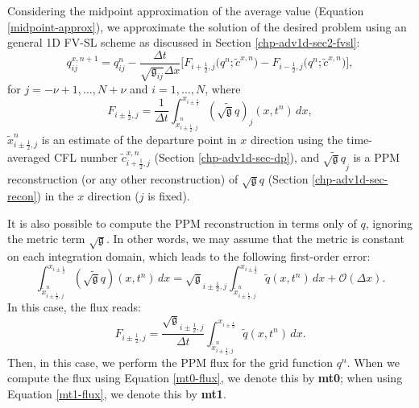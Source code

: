 Considering the midpoint approximation of the average value (Equation \eqref{midpoint-approx}), we approximate
the solution of the desired problem using an general 1D FV-SL scheme as discussed in Section \ref{chp-adv1d-sec2-fvsl}:
\begin{equation}
	\label{1d-qx}
	q^{x,n+1}_{ij} = q^{n}_{ij}  - \frac{\Delta t}{\sqrt{\mathfrak{g}_{ij}}\Delta x}
	\bigg[{F}_{i+\frac{1}{2},j}
	\big({q}^{n}; \tilde{c}^{x,n}\big) - 
	{F}_{i-\frac{1}{2},j}
	\big({q}^{n}; \tilde{c}^{x,n}\big)\bigg],
\end{equation}
for  $j=-\nu+1, \ldots, N+\nu$ and $i=1, \ldots, N$, where
\begin{equation}
	\label{mt0-flux}
	{F}_{i\pm\frac{1}{2},j} = \frac{1}{\Delta t}\int_{ \tilde{x}_{i\pm\frac{1}{2},j}^n}^{x_{i\pm\frac{1}{2}}}(\widetilde{\sqrt{\mathfrak{g}}{q}})_j(x, t^n) \,dx,
\end{equation}
$\tilde{x}_{i\pm\frac{1}{2},j}^n$ is an estimate of the departure point in $x$ direction using the time-averaged
CFL number $\tilde{c}^{x,n}_{i+\frac{1}{2},j}$ (Section \ref{chp-adv1d-sec-dp}),
and $\widetilde{\sqrt{\mathfrak{g}}{q}}_j$ is a PPM reconstruction (or any other reconstruction) of $\sqrt{\mathfrak{g}}{q}$ (Section \ref{chp-adv1d-sec-recon})
in the $x$ direction ($j$ is fixed).

It is also possible to compute the PPM reconstruction in terms only of $q$, ignoring the metric term $\sqrt{\mathfrak{g}}$.
In other words, we may assume that the metric is constant on each integration domain, which leads to the following first-order error:
\begin{equation}
\int_{ \tilde{x}_{i\pm\frac{1}{2},j}^n}^{x_{i\pm\frac{1}{2}}}(\widetilde{\sqrt{\mathfrak{g}}{q}})(x, t^n) \,dx
= \sqrt{\mathfrak{g}}_{i\pm\frac{1}{2},j}\int_{  \tilde{x}_{i\pm\frac{1}{2},j}^n}^{x_{i\pm\frac{1}{2}}}\widetilde{q}(x, t^n) \,dx + \mathcal{O}(\Delta x).
\end{equation}
In this case, the flux reads:
\begin{equation}
	\label{mt1-flux}
	{F}_{i\pm\frac{1}{2},j} =  \frac{\sqrt{\mathfrak{g}}_{i\pm\frac{1}{2},j}}{\Delta t}\int_{  \tilde{x}_{i\pm\frac{1}{2},j}^n}^{x_{i\pm\frac{1}{2}}}\widetilde{q}(x, t^n)  \,dx.
\end{equation}
Then, in this case, we perform the PPM flux for the grid function $q^n$.
When we compute the flux using Equation \eqref{mt0-flux}, we denote this by \textbf{mt0};
when using Equation \eqref{mt1-flux}, we denote this by \textbf{mt1}.

